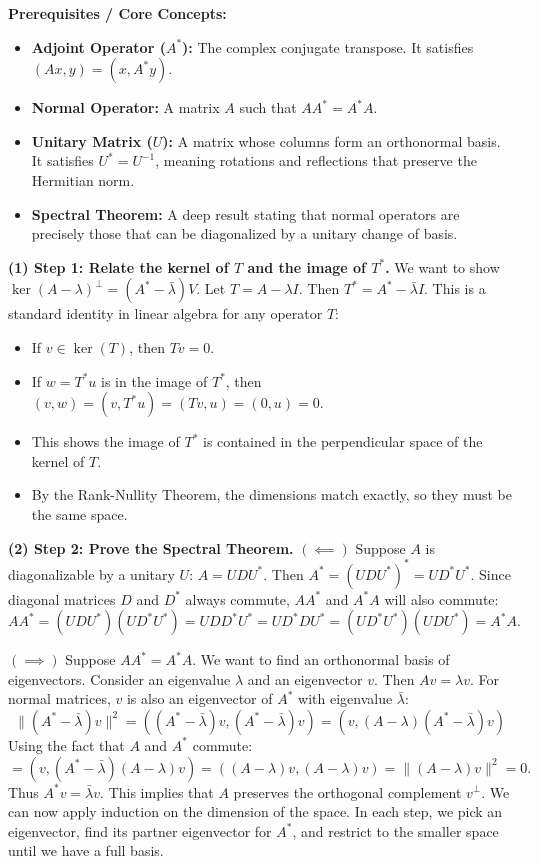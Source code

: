 \begin{solution}
\textbf{Prerequisites / Core Concepts:}
\begin{itemize}
    \item \textbf{Adjoint Operator ($A^*$):} The complex conjugate transpose. It satisfies $(Ax, y) = (x, A^* y)$.
    \item \textbf{Normal Operator:} A matrix $A$ such that $A A^* = A^* A$.
    \item \textbf{Unitary Matrix ($U$):} A matrix whose columns form an orthonormal basis. It satisfies $U^* = U^{-1}$, meaning rotations and reflections that preserve the Hermitian norm.
    \item \textbf{Spectral Theorem:} A deep result stating that normal operators are precisely those that can be diagonalized by a unitary change of basis.
\end{itemize}

\textbf{(1) Step 1: Relate the kernel of $T$ and the image of $T^*$.}
We want to show $\ker(A - \lambda)^\perp = (A^* - \bar{\lambda})V$.
Let $T = A - \lambda I$. Then $T^* = A^* - \bar{\lambda} I$.
This is a standard identity in linear algebra for any operator $T$:
\begin{itemize}
    \item If $v \in \ker(T)$, then $Tv = 0$.
    \item If $w = T^* u$ is in the image of $T^*$, then $(v, w) = (v, T^* u) = (Tv, u) = (0, u) = 0$.
    \item This shows the image of $T^*$ is contained in the perpendicular space of the kernel of $T$.
    \item By the Rank-Nullity Theorem, the dimensions match exactly, so they must be the same space.
\end{itemize}

\textbf{(2) Step 2: Prove the Spectral Theorem.}
$(\impliedby)$ Suppose $A$ is diagonalizable by a unitary $U$: $A = U D U^*$.
Then $A^* = (U D U^*)^* = U D^* U^*$.
Since diagonal matrices $D$ and $D^*$ always commute, $A A^*$ and $A^* A$ will also commute:
\[ A A^* = (U D U^*)(U D^* U^*) = U D D^* U^* = U D^* D U^* = (U D^* U^*)(U D U^*) = A^* A. \]

$(\implies)$ Suppose $A A^* = A^* A$. We want to find an orthonormal basis of eigenvectors.
Consider an eigenvalue $\lambda$ and an eigenvector $v$. Then $Av = \lambda v$.
For normal matrices, $v$ is also an eigenvector of $A^*$ with eigenvalue $\bar{\lambda}$:
\[ \| (A^* - \bar{\lambda}) v \|^2 = ( (A^* - \bar{\lambda})v, (A^* - \bar{\lambda})v ) = ( v, (A - \lambda)(A^* - \bar{\lambda})v ) \]
Using the fact that $A$ and $A^*$ commute:
\[ = ( v, (A^* - \bar{\lambda})(A - \lambda)v ) = ( (A - \lambda)v, (A - \lambda)v ) = \| (A - \lambda) v \|^2 = 0. \]
Thus $A^* v = \bar{\lambda} v$.
This implies that $A$ preserves the orthogonal complement $v^\perp$. We can now apply induction on the dimension of the space. In each step, we pick an eigenvector, find its partner eigenvector for $A^*$, and restrict to the smaller space until we have a full basis.
\end{solution}

